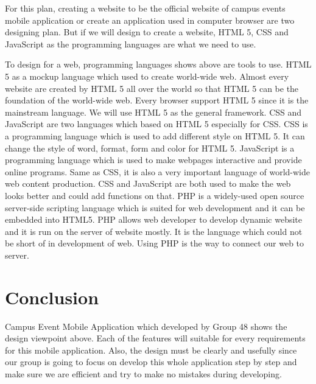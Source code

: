 \documentclass[letterpaper, 10pt,titlepage]{article}
\begin{document}
For this plan, creating a website to be the official website of campus events mobile application or create an
application used in computer browser are two designing plan. But if we will design to create a website, HTML 5, CSS and JavaScript as the programming languages are what we need to use. 

To design for a web, programming languages shows above are tools to use. HTML 5 as a mockup language which used to create world-wide web. Almost every website are created by HTML 5 all over the world so that HTML 5 can be the foundation of the world-wide web. Every browser support HTML 5 since it is the mainstream language. We will use HTML 5 as the general framework. CSS and JavaScript are two languages which based on HTML 5 especially for CSS. CSS is a programming language which is used to add different style on HTML 5. It can change the style of word, format, form and color for HTML 5. JavaScript is a programming language which is used to make webpages interactive and provide online programs. Same as CSS, it is also a very important language of world-wide web content production. CSS and JavaScript are both used to make the web looks better and could add functions on that. PHP is a widely-used open source server-side scripting language which is suited for web development and it can be embedded into HTML5. PHP allows web developer to develop dynamic website and it is run on the server of website mostly. \cite{php} It is the language which could not be short of in development of web. Using PHP is the way to connect our web to server.

\section{Conclusion}
Campus Event Mobile Application which developed by Group 48 shows the design viewpoint above. Each of the features will suitable for every requirements for this mobile application. Also, the design must be clearly and usefully since our group is going to focus on develop this whole application step by step and make sure we are efficient and try to make no mistakes during developing. 
\end{document}
